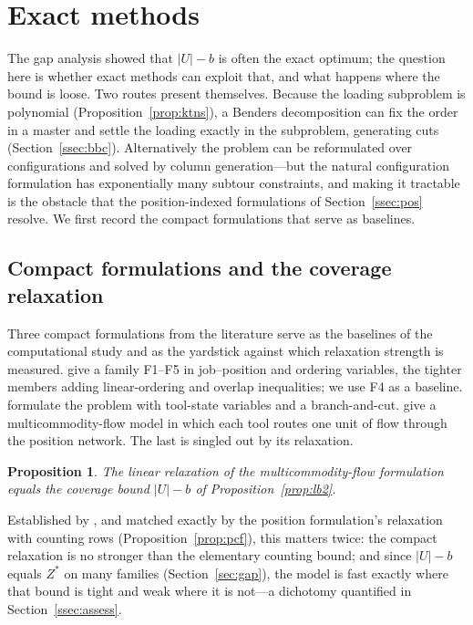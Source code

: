 \documentclass[11pt,a4paper]{article}
\theoremstyle{plain}
\newtheorem{proposition}{Proposition}
\theoremstyle{definition}
\theoremstyle{remark}
\newcommand{\U}{U}
\newcommand{\Zst}{Z^{\ast}}
\begin{document}
\section{Exact methods}\label{sec:exact}
The gap analysis showed that $\lvert\U\rvert-b$ is often the exact optimum; the question
here is whether exact methods can exploit that, and what happens where the bound is
loose. Two routes present themselves. Because the loading subproblem is polynomial
(Proposition~\ref{prop:ktns}), a Benders decomposition can fix the order in a master and
settle the loading exactly in the subproblem, generating cuts (Section~\ref{ssec:bbc}).
Alternatively the problem can be reformulated over configurations and solved by column
generation---but the natural configuration formulation has exponentially many subtour
constraints, and making it tractable is the obstacle that the position-indexed
formulations of Section~\ref{ssec:pos} resolve. We first record the compact formulations
that serve as baselines.

\subsection{Compact formulations and the coverage relaxation}\label{ssec:compact}
Three compact formulations from the literature serve as the baselines of the
computational study and as the yardstick against which relaxation strength is
measured. \citet{Catanzaro2015} give a
family F1--F5 in job--position and ordering variables, the tighter members adding
linear-ordering and overlap inequalities; we use F4 as a baseline.
\citet{Laporte2004} formulate the problem with tool-state variables and a
branch-and-cut. \citet{daSilva2024} give a multicommodity-flow model in which each
tool routes one unit of flow through the position network. The last is singled out
by its relaxation.
\begin{proposition}\label{prop:sspmf-lp}
The linear relaxation of the multicommodity-flow formulation equals the coverage
bound $\lvert\U\rvert-b$ of Proposition~\ref{prop:lb2}.
\end{proposition}
\noindent Established by \citet{daSilva2024}, and matched exactly by the position
formulation's relaxation with counting rows (Proposition~\ref{prop:pcf}), this matters
twice: the compact relaxation is no stronger than the elementary counting bound; and
since $\lvert\U\rvert-b$ equals $\Zst$ on many families (Section~\ref{sec:gap}), the
model is fast exactly where that bound is tight and weak where it is not---a
dichotomy quantified in Section~\ref{ssec:assess}.
\end{document}
